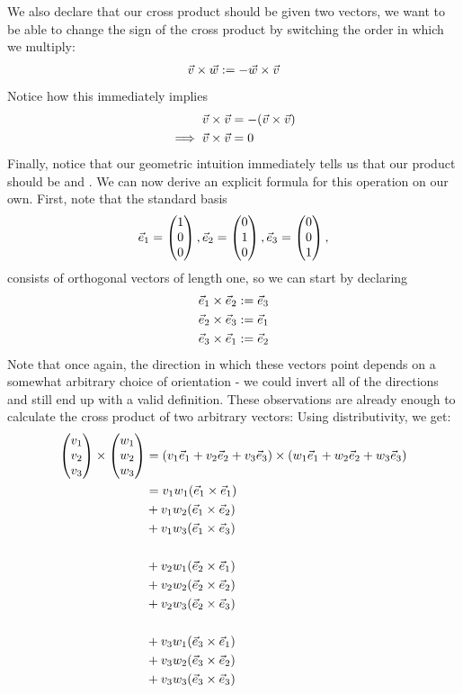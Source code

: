 \newpar
We also declare that our cross product should be  given two vectors, we want to be able to change the sign of the cross product by switching the order in which we multiply:
\begin{align*}
	\vec{v} \times \vec{w} := -\vec{w} \times \vec{v}
\end{align*}
Notice how this immediately implies
\begin{align*}
	\vec{v} \times \vec{v} &= - (\vec{v} \times \vec{v})\\
	\implies \vec{v} \times \vec{v} &= 0
\end{align*}
Finally, notice that our geometric intuition immediately tells us that our product should be  and . 
\newpar
We can now derive an explicit formula for this operation on our own. 
First, note that the standard basis
\begin{align*}
	\vec{e}_1 = \begin{pmatrix} 1\\0\\0\end{pmatrix}, \vec{e}_2 = \begin{pmatrix} 0\\1\\0\end{pmatrix}, \vec{e}_3 = \begin{pmatrix} 0\\0\\1\end{pmatrix},
\end{align*}
consists of orthogonal vectors of length one, so we can start by declaring
\begin{align*}
	\vec{e}_1 \times \vec{e}_2 &:= \vec{e}_3\\
	\vec{e}_2 \times \vec{e}_3 &:= \vec{e}_1\\
	\vec{e}_3 \times \vec{e}_1 &:= \vec{e}_2
\end{align*}
Note that once again, the direction in which these vectors point depends on a somewhat arbitrary choice of orientation - we could invert all of the directions and still end up with a valid definition.
\newpar
These observations are already enough to calculate the cross product of two arbitrary vectors: Using distributivity, we get:
\begin{align*}
	\begin{pmatrix} v_1\\v_2\\v_3\end{pmatrix} \times \begin{pmatrix} w_1\\w_2\\w_3\end{pmatrix}
	&=
	(v_1 \vec{e}_1 + v_2\vec{e}_2 + v_3\vec{e}_3) \times (w_1 \vec{e}_1 + w_2\vec{e}_2 + w_3\vec{e}_3)\\
	&=
	v_1w_1 (\vec{e}_1 \times \vec{e}_1)\\
	&+
	v_1w_2 (\vec{e}_1 \times \vec{e}_2)\\
	&+
	v_1w_3 (\vec{e}_1 \times \vec{e}_3)\\\\
	&+
	v_2w_1 (\vec{e}_2 \times \vec{e}_1)\\
	&+
	v_2w_2 (\vec{e}_2 \times \vec{e}_2)\\
	&+
	v_2w_3 (\vec{e}_2 \times \vec{e}_3)\\\\
	&+
	v_3w_1 (\vec{e}_3 \times \vec{e}_1)\\
	&+
	v_3w_2 (\vec{e}_3 \times \vec{e}_2)\\
	&+
	v_3w_3 (\vec{e}_3 \times \vec{e}_3)
\end{align*}
